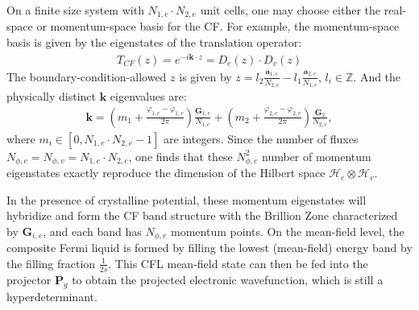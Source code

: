\begin{subappendices}
On a finite size system with $N_{1,e}\cdot N_{2,e}$ unit cells, one may choose either the real-space or momentum-space basis for the CF. For example, the momentum-space basis is given by the eigenstates of the translation operator:
\begin{align}
T_{CF}(z)=e^{-i\bm k\cdot z}=D_e(z)\cdot D_v(z)
\end{align}
The boundary-condition-allowed $z$ is given by $z=l_2\frac{\mathbf a_{1,e}}{N_{2,e}}-l_1\frac{\mathbf a_{2,e}}{N_{1,e}}$, $l_i\in \mathbb Z$. And the physically distinct $\bm k$ eigenvalues are:
\begin{align}
\bm k= (m_{1}+\frac{\varphi_{1,e}-\varphi_{1,v}}{2\pi})\frac{\mathbf G_{1,e}}{N_{1,e}}+(m_{2}+\frac{\varphi_{2,e}-\varphi_{2,v}}{2\pi})\frac{\mathbf G_{2}}{N_{2,e}},
\end{align}
where $m_i\in [0,N_{1,e}\cdot N_{2,e}-1]$ are integers. Since the number of fluxes $N_{\phi,e}=N_{\phi,v}=N_{1,e}\cdot N_{2,e}$, one finds that these $N_{\phi,e}^2$ number of momentum eigenstates exactly reproduce the dimension of the Hilbert space $\mathcal H_e\otimes \mathcal H_v$.

In the presence of crystalline potential, these momentum eigenstates will hybridize and form the CF band structure with the Brillion Zone characterized by $\mathbf G_{i,e}$, and each band has $N_{\phi,e}$ momentum points. On the mean-field level, the composite Fermi liquid is formed by filling the lowest (mean-field) energy band by the filling fraction $\frac{1}{2s}$. This CFL mean-field state can then be fed into the projector $\mathbf P_g$ to obtain the projected electronic wavefunction, which is still a hyperdeterminant.


\end{subappendices}

